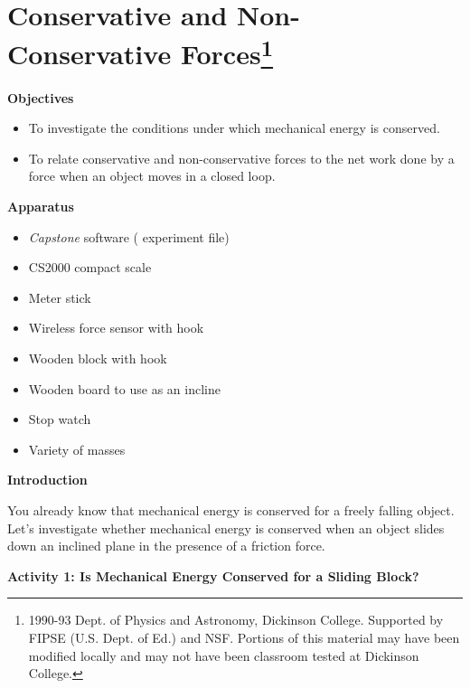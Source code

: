 
\section{Conservative and Non-Conservative Forces\footnote{
1990-93 Dept. of Physics and Astronomy, Dickinson College. Supported by FIPSE
(U.S. Dept. of Ed.) and NSF. Portions of this material may have been modified
locally and may not have been classroom tested at Dickinson College.
}}

\makelabheader %

\medskip
\textbf{Objectives} 

\begin{itemize}[nosep]
\item To investigate the conditions under which mechanical energy is conserved. 
\item To relate conservative and non-conservative forces to the net work done by a
force when an object moves in a closed loop.
\end{itemize}

\medskip
\textbf{Apparatus} 
\begin{itemize}[nosep]
\item \textit{Capstone} software ( experiment file)
\item CS2000 compact scale
\item Meter stick 
\item Wireless force sensor with hook
\item Wooden block with hook
\item Wooden board to use as an incline 
\item Stop watch
\item Variety of masses 

\end{itemize}

\textbf{Introduction }

You already know that mechanical energy is conserved
for a freely falling object. Let's investigate whether mechanical energy is
conserved when an object slides down an inclined plane in the presence of a
friction force.

\textbf{Activity 1: Is Mechanical Energy Conserved for a Sliding Block? }

